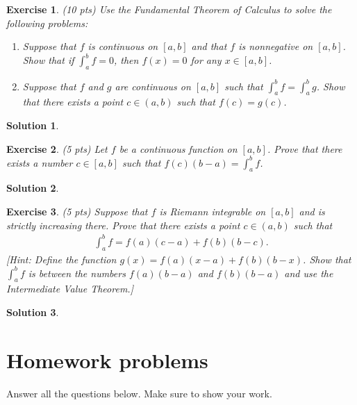 \documentclass[12pt]{article}
\theoremstyle{plain}
\newtheorem{exer}{\textbf{Exercise}}}
\theoremstyle{plain}
\newtheorem*{sol}{\textbf{Solution}}}
\begin{document}
\begin{exer}
(10 pts)
Use the Fundamental Theorem of Calculus to solve the following problems:
	\begin{enumerate}[label=\textbf{\alph*)}]
	\item Suppose that $f$ is continuous on $[a, b]$ and that $f$ is nonnegative on $[a, b]$. Show that if $\int_a^b f = 0$, then $f(x) = 0$ for any $x \in [a, b]$.
	\item Suppose that $f$ and $g$ are continuous on $[a, b]$ such that $\int_a^b f = \int_a^b g$. Show that there exists a point $c \in (a, b)$ such that $f(c) = g(c)$.
	\end{enumerate}
\end{exer}
\begin{sol}

\end{sol}

\begin{exer}
(5 pts)
Let $f$ be a continuous function on $[a, b]$. Prove that there exists a number $c \in [a, b]$ such that $f(c) (b - a) = \int_a^b f$.
\end{exer}
\begin{sol}

\end{sol}

\begin{exer}
(5 pts)
Suppose that $f$ is Riemann integrable on $[a, b]$ and is strictly increasing there. Prove that there exists a point $c \in (a, b)$ such that 
	\begin{align*}
	\int_a^b f = f(a) (c - a) + f(b) (b - c).
	\end{align*}
[Hint: Define the function $g(x) = f(a) (x - a) + f(b) (b - x)$. Show that $\int_a^b f$ is between the numbers $f(a) (b - a)$ and $f(b) (b - a)$ and use the Intermediate Value Theorem.]
\end{exer}
\begin{sol}

\end{sol}

\section{Homework problems}
Answer all the questions below. Make sure to show your work.
\end{document}
